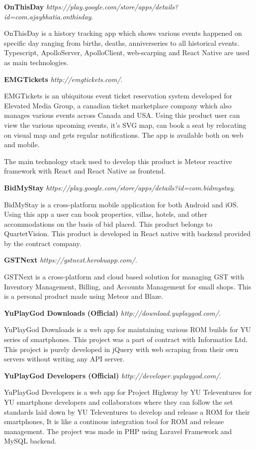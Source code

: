 \documentclass[margin,line]{res}
\begin{document}
\begin{resume}
\textbf{OnThisDay} {\em https://play.google.com/store/apps/details?id=com.ajaybhatia.onthisday}. 

OnThisDay is a history tracking app which shows various events happened on specific day ranging from births, deaths, anniverseries to all historical events. Typescript, ApolloServer, ApolloClient, web-scarping and React Native are used as main technologies.  
 
\textbf{EMGTickets} {\em http://emgtickets.com/}. 

EMGTickets is an ubiquitous event ticket reservation system developed for Elevated Media Group, a canadian ticket marketplace company which also manages various events across Canada and USA. Using this product user can view the various upcoming events, it's SVG map, can book a seat by relocating on visual map and gets regular notifications. The app is available both on web and mobile. 

The main technology stack used to develop this product is Meteor reactive framework with React and React Native as frontend.

\textbf{BidMyStay} {\em https://play.google.com/store/apps/details?id=com.bidmystay}. 

BidMyStay is a cross-platform mobile application for both Android and iOS. Using this app a user can book properties, villas, hotels, and other accommodations on the basis of bid placed. This product belongs to QuartetVision. This product is developed in React native with backend provided by the contract company.

\textbf{GSTNext} {\em https://gstnext.herokuapp.com/}.

GSTNext is a cross-platform and cloud based solution for managing GST with Inventory Management, Billing, and Accounts Management for small shops. This is a personal product made using Meteor and Blaze.

\textbf{YuPlayGod Downloads (Official)} {\em http://download.yuplaygod.com/}. 

YuPlayGod Downloads is a web app for maintaining various ROM builds for YU series of smartphones. This project was a part of contract with Informatics Ltd. This project is purely developed in jQuery with web scraping from their own servers without writing any API server.

\textbf{YuPlayGod Developers (Official)} {\em http://developer.yuplaygod.com/}.

YuPlayGod Developers is a web app for Project Highway by YU Televentures for YU smartphone developers and collaborators where they can follow the set standards laid down by YU Televentures to develop and release a ROM for their smartphones, It is like a continous integration tool for ROM and release management. The project was made in PHP using  Laravel Framework and MySQL backend.


\end{resume}
\end{document}
